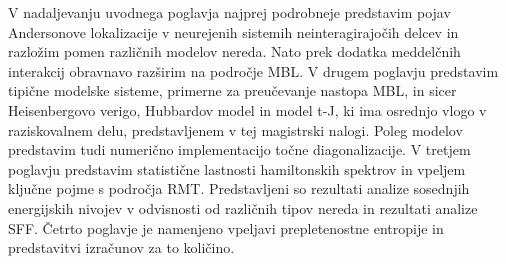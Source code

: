 \documentclass[10pt,a4paper]{article}
\begin{document}
  V nadaljevanju uvodnega poglavja najprej podrobneje predstavim pojav Andersonove lokalizacije v neurejenih sistemih neinteragirajočih delcev in razložim pomen različnih modelov nereda. Nato prek dodatka meddelčnih interakcij obravnavo razširim na področje MBL. V drugem poglavju predstavim tipične modelske sisteme, primerne za preučevanje nastopa MBL, in sicer Heisenbergovo verigo, Hubbardov model in model t-J, ki ima osrednjo vlogo v raziskovalnem delu, predstavljenem v tej magistrski nalogi. Poleg modelov predstavim tudi numerično implementacijo točne diagonalizacije. V tretjem poglavju predstavim statistične lastnosti hamiltonskih spektrov in vpeljem ključne pojme s področja RMT. Predstavljeni so rezultati analize sosednjih energijskih nivojev v odvisnosti od različnih tipov nereda in rezultati analize SFF. Četrto poglavje je namenjeno vpeljavi prepletenostne entropije in predstavitvi izračunov za to količino. 




\newpage
%
\end{document}
